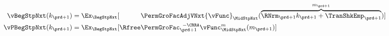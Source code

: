   \begin{equation}\begin{gathered}\begin{aligned}
        \vBegStpNxt(k_{\prd+1})    & = \Ex_{\BegStpNxt}[\phantom{\Rfree}\PermGroFacAdjVNxt{\vFunc}_{\MidStpNxt}(\overbrace{\RNrm_{\prd+1}k_{\prd+1}+{\TranShkEmp}_{\prd+1}}^{m_{\prd+1}})] \label{eq:vFuncBegtpdefn} \\
        \vPBegStpNxt(k_{\prd+1}) & = \Ex_{\BegStpNxt}[\Rfree \PermGroFac_{\prd+1}^{\phantom{1}-\CRRA} \vFunc_{\MidStpNxt}^{m}(m_{\prd+1})]
      \end{aligned}\end{gathered}\end{equation}
